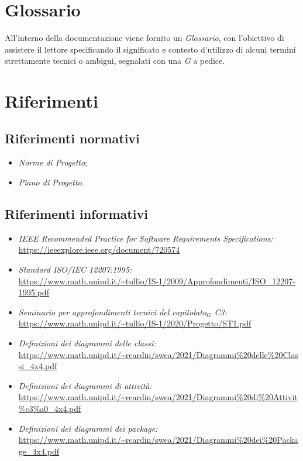 \section{Glossario}\label{1.3}
All'interno della documentazione viene fornito un \textit{Glossario}, con l'obiettivo di assistere il lettore specificando il significato e contesto d'utilizzo di alcuni termini strettamente tecnici o ambigui, segnalati con una \textit{G} a pedice.

\section{Riferimenti}\label{IntroduzioneRiferimenti}
\subsection{Riferimenti normativi}\label{IntroduzioneRiferimentiNormativi}
\begin{itemize}
	\item \textit{Norme di Progetto};
	\item \textit{Piano di Progetto}.
\end{itemize}
\subsection{Riferimenti informativi}\label{IntroduzioneRiferimentiInformativi}
\begin{itemize}
	\item \textit{IEEE Recommended Practice for Software Requirements Specifications:}\\
		\url{https://ieeexplore.ieee.org/document/720574}
	\item \textit{Standard ISO/IEC 12207:1995:}\\
		\url{https://www.math.unipd.it/~tullio/IS-1/2009/Approfondimenti/ISO_12207-1995.pdf}
	\item \textit{Seminario per approfondimenti tecnici del capitolato$_G$ C3:}\\
		\url{https://www.math.unipd.it/~tullio/IS-1/2020/Progetto/ST1.pdf}	
	\item \textit{Definizioni dei diagrammi delle classi:}\\
		\url{https://www.math.unipd.it/~rcardin/swea/2021/Diagrammi\%20delle\%20Classi_4x4.pdf}
	\item \textit{Definizioni dei diagrammi di attività:}\\
		\url{https://www.math.unipd.it/~rcardin/swea/2021/Diagrammi\%20di\%20Attivit\%c3\%a0_4x4.pdf}	
	\item \textit{Definizioni dei diagrammi dei package:}\\
		\url{https://www.math.unipd.it/~rcardin/swea/2021/Diagrammi\%20dei\%20Package_4x4.pdf}		
	
\end{itemize}